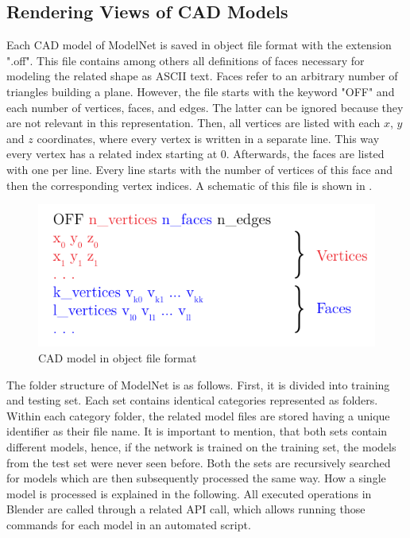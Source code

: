 \subsection{Rendering Views of CAD Models}
\label{sec:dataset-rendering}
Each CAD model of ModelNet is saved in object file format with the extension ".off".
This file contains among others all definitions of faces necessary for modeling the related shape as ASCII text.
Faces refer to an arbitrary number of triangles building a plane.
However, the file starts with the keyword "OFF" and each number of vertices, faces, and edges.
The latter can be ignored because they are not relevant in this representation.
Then, all vertices are listed with each $x$, $y$ and $z$ coordinates, where every vertex is written in a separate line.
This way every vertex has a related index starting at 0.
Afterwards, the faces are listed with one per line.
Every line starts with the number of vertices of this face and then the corresponding vertex indices.
A schematic of this file is shown in .
\begin{figure}
	\centering
	\includegraphics[]{images/off.pdf}
	\caption{CAD model in object file format}
	\label{fig:off}
\end{figure}

The folder structure of ModelNet is as follows.
First, it is divided into training and testing set.
Each set contains identical categories represented as folders.
Within each category folder, the related model files are stored having a unique identifier as their file name.
It is important to mention, that both sets contain different models, hence, if the network is trained on the training set, the models from the test set were never seen before.
Both the sets are recursively searched for models which are then subsequently processed the same way.
How a single model is processed is explained in the following.
All executed operations in Blender are called through a related API call, which allows running those commands for each model in an automated script.

